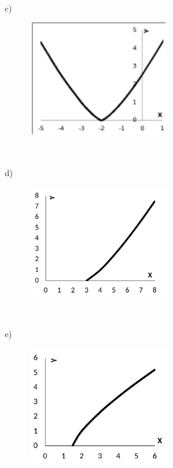 \begin{respostas}{2}
~~

c)\quad 

\begin{figure}[H]
	\begin{Center}
		\includegraphics[width=2.46in,height=1.95in]{capitulos/outras_funcoes/media/image36.pdf}
	\end{Center}
\end{figure}

~~

d)

\begin{figure}[H]
	\begin{Center}
		\includegraphics[width=2.46in,height=1.89in]{capitulos/outras_funcoes/media/image37.pdf}
	\end{Center}
\end{figure}

~~

e) \quad 

\begin{figure}[H]
	\begin{Center}
		\includegraphics[width=2.46in,height=1.99in]{capitulos/outras_funcoes/media/image38.pdf}
	\end{Center}
\end{figure}


\end{respostas}

